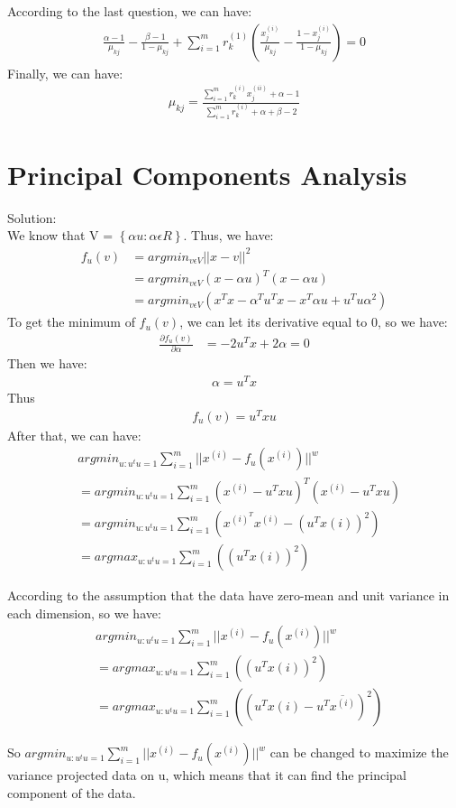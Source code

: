 \documentclass[paper=a4, fontsize=11pt]{scrartcl} %
\numberwithin{equation}{section} %
\numberwithin{figure}{section} %
\numberwithin{table}{section} %
\begin{document}
According to the last question, we can have:
\begin{align*}
\frac{\alpha - 1}{\mu_{kj}} - \frac{\beta - 1}{1 - \mu_{kj}} + \sum_{i=1}^{m}r_{k}^{(1)}\left ( \frac{x_{j}^{(i)}}{\mu_{kj}}- \frac{1-x_{j}^{(i)}}{1-\mu_{kj}}\right )=0
\end{align*}
Finally, we can have:
\begin{align*}
\mu_{kj}=\frac{\sum_{i=1}^{m}r_{k}^{(i)}x_{j}^{(ii)} + \alpha -1}{\sum_{i=1}^{m}r_{k}^{(i)} + \alpha + \beta - 2}
\end{align*}


\section{Principal Components Analysis}
Solution: 
\\We know that V = $\left \{ \alpha u : \alpha \epsilon R \right \}$. Thus, we have:
\begin{align*}
f_{u}(v)& = argmin_{v\epsilon V}||x - v||^{2}
\\&= argmin_{v\epsilon V}(x - \alpha u)^{T}(x - \alpha u)
\\&= argmin_{v\epsilon V}(x^{T}x - \alpha^{T}u^{T}x - x^{T}\alpha u  + u^{T}u \alpha^{2})
\end{align*}
To get the minimum of $f_{u}(v)$, we can let its derivative equal to 0, so we have:
\begin{align*}
\frac{\partial f_{u}(v)}{\partial  \alpha}&=-2u^{T}x + 2\alpha = 0
\end{align*}
Then we have:
\begin{align*}
\alpha = u^{T}x
\end{align*}
Thus
\begin{align*}
f_{u}(v)=u^{T}xu
\end{align*}
After that, we can have:
\begin{align*}
&argmin_{u:u^{t}u=1}\sum_{i=1}^{m}||x^{(i)}-f_{u}(x^{(i)})||^{w}
\\&=argmin_{u:u^{t}u=1}\sum_{i=1}^{m}\left ( x^{(i) }- u^{T}xu \right )^{T}\left (  x^{(i) }- u^{T}xu\right )
\\&=argmin_{u:u^{t}u=1}\sum_{i=1}^{m}\left ( x^{(i)^{T}}x^{(i)} -  \left ( u^{T}x{(i)} \right )^{2}\right )
\\&=argmax_{u:u^{t}u=1}\sum_{i=1}^{m}\left (\left ( u^{T}x{(i)} \right )^{2} \right )
\end{align*}

According to the assumption that the data have zero-mean and unit variance in each dimension, so we have:
\begin{align*}
&argmin_{u:u^{t}u=1}\sum_{i=1}^{m}||x^{(i)}-f_{u}(x^{(i)})||^{w}
\\&=argmax_{u:u^{t}u=1}\sum_{i=1}^{m}\left (\left ( u^{T}x{(i)} \right )^{2} \right )
\\&=argmax_{u:u^{t}u=1}\sum_{i=1}^{m}\left (\left ( u^{T}x{(i)} - u^{T} \overline{x^{(i)}}\right )^{2} \right )
\end{align*}

So $argmin_{u:u^{t}u=1}\sum_{i=1}^{m}||x^{(i)}-f_{u}(x^{(i)})||^{w}$ can be changed to maximize the variance projected data on u, which means that it can find the principal component of the data.
\end{document}
